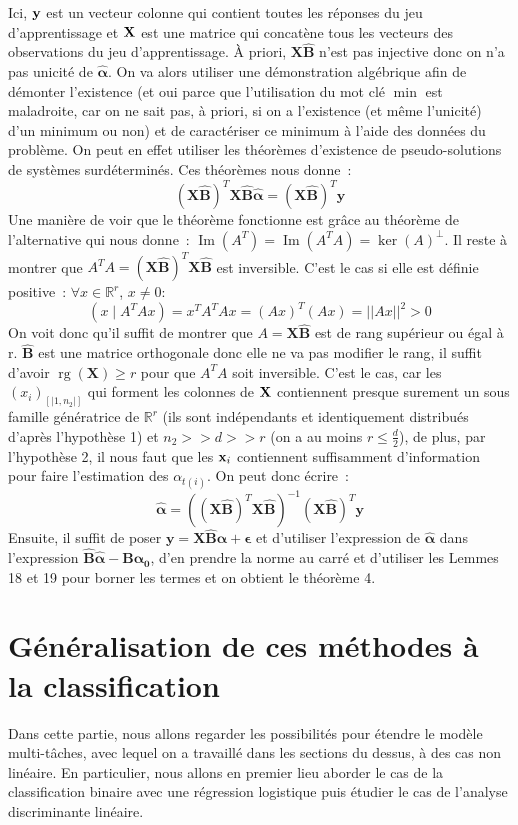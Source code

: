 \documentclass[12pt]{article}
\DeclareMathOperator{\Ima}{Im}
\DeclareMathOperator{\rank}{rg}
\begin{document}
Ici, $\bf y$ est un vecteur colonne qui contient toutes les réponses du jeu d'apprentissage et $\bf X$ est une matrice qui concatène tous les vecteurs des observations du jeu d'apprentissage.  
À priori, $\textbf{X}\hat{\textbf{B}}$ n'est pas injective donc on n'a pas unicité de $\bm {\hat \alpha}$. On va alors utiliser une démonstration algébrique afin de démonter l'existence (et oui parce que l'utilisation du mot clé $\min$ est maladroite, car on ne sait pas, à priori, si on a l'existence (et même l'unicité) d'un minimum ou non) et de caractériser ce minimum à l'aide des données du problème. On peut en effet utiliser les théorèmes d'existence de 
pseudo-solutions de systèmes surdéterminés. Ces théorèmes nous donne~:
$$
(\bm{X \hat{B}})^T\bm{X \hat{B}\hat{\alpha}} = (\bm{X \hat{B}})^T \textbf{y}
$$
Une manière de voir que le théorème fonctionne est grâce au théorème de l'alternative qui nous donne~: $\Ima(A^T) = \Ima(A^TA) = \ker(A)^{\perp}$. Il reste à montrer que $A^TA = (\bm{X \hat{B}})^T\bm{X \hat{B}}$ est inversible. C'est le cas si elle est définie positive~: $\forall x \in \mathbb{R}^r$, $x \neq 0$:
$$
(x \mid A^TAx) = x^TA^TAx = (Ax)^T(Ax) = \lvert \lvert Ax \rvert \rvert^2 > 0 
$$
On voit donc qu'il suffit de montrer que $A = \bm{X \hat{B}}$ est de rang supérieur ou égal à r. $\bm{\hat{B}}$ est une matrice orthogonale donc elle ne va pas modifier le rang, il suffit d'avoir $\rank(\textbf{X}) \geq r$ pour que $A^TA$ soit inversible. C'est le cas, car les $(x_i)_{[|1, n_ 2|]}$ qui forment les colonnes de $\bf X$ contiennent presque surement un sous famille génératrice de $\mathbb{R}^r$ (ils sont indépendants et identiquement distribués d'après l'hypothèse 1) et $n_2 >> d >> r$ (on a au moins $r\leq \frac{d}{2}$), de plus, par l'hypothèse 2, il nous faut que les ${\bf x}_i$ contiennent suffisamment d'information pour faire l'estimation des $\alpha_{t(i)}$. On peut donc écrire~:
$$
\bm{\hat{\alpha}} = ((\bm{X \hat{B}})^T\bm{X \hat{B}})^{-1}(\bm{X \hat{B}})^T \textbf{y}
$$
Ensuite, il suffit de poser $\bm{y = X \hat{B} \alpha + \epsilon}$ et d'utiliser l'expression de $\bm {\hat{\alpha}}$ dans l'expression $\bm{\hat{B}\hat{\alpha}} - \bm{B \alpha_0}$, d'en prendre la norme au carré et d'utiliser les Lemmes 18 et 19 pour borner les termes et on obtient le théorème 4.

\section{Généralisation de ces méthodes à la classification}
Dans cette partie, nous allons regarder les possibilités pour étendre le modèle multi-tâches, avec lequel on a travaillé dans les sections du dessus, à des cas non linéaire. En particulier, nous allons en premier lieu aborder le cas de la classification binaire avec une régression logistique puis étudier le cas de l'analyse discriminante linéaire.
\end{document}
